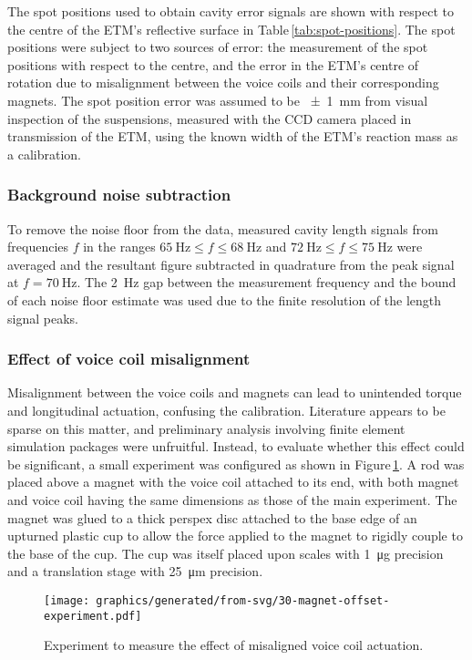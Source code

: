 The spot positions used to obtain cavity error signals are shown with respect to the centre of the \gls{ETM}'s reflective surface in Table\,\ref{tab:spot-positions}. The spot positions were subject to two sources of error: the measurement of the spot positions with respect to the centre, and the error in the \gls{ETM}'s centre of rotation due to misalignment between the voice coils and their corresponding magnets. The spot position error was assumed to be \SI{\pm1}{\milli\meter} from visual inspection of the suspensions, measured with the CCD camera placed in transmission of the \gls{ETM}, using the known width of the \gls{ETM}'s reaction mass as a calibration.

\subsubsection{Background noise subtraction}
To remove the noise floor from the data, measured cavity length signals from frequencies $f$ in the ranges $\SI{65}{\hertz} \le f \le \SI{68}{\hertz}$ and $\SI{72}{\hertz} \le f \le \SI{75}{\hertz}$ were averaged and the resultant figure subtracted in quadrature from the peak signal at $f = \SI{70}{\hertz}$. The \SI{2}{\hertz} gap between the measurement frequency and the bound of each noise floor estimate was used due to the finite resolution of the length signal peaks.

\subsubsection{Effect of voice coil misalignment}
Misalignment between the voice coils and magnets can lead to unintended torque and longitudinal actuation, confusing the calibration. Literature appears to be sparse on this matter, and preliminary analysis involving finite element simulation packages were unfruitful. Instead, to evaluate whether this effect could be significant, a small experiment was configured as shown in Figure\,\ref{fig:misaligned-voice-coil-experiment}. A rod was placed above a magnet with the voice coil attached to its end, with both magnet and voice coil having the same dimensions as those of the main experiment. The magnet was glued to a thick perspex disc attached to the base edge of an upturned plastic cup to allow the force applied to the magnet to rigidly couple to the base of the cup. The cup was itself placed upon scales with \SI{1}{\micro\gram} precision and a translation stage with \SI{25}{\micro\meter} precision.

\begin{figure}
  \centering
  \texttt{[image: graphics/generated/from-svg/30-magnet-offset-experiment.pdf]}
  \caption[Experiment to measure the effect of misaligned voice coil actuation]{\label{fig:misaligned-voice-coil-experiment}Experiment to measure the effect of misaligned voice coil actuation.}
\end{figure}


